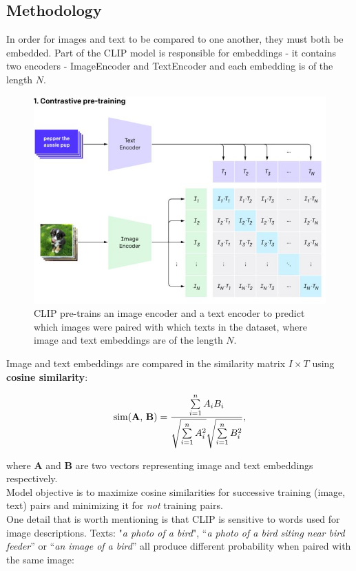 \documentclass[12pt,a4paper,openany]{book}
\begin{document}
\subsection{Methodology}
\noindent In order for images and text to be compared to one another, they must both be embedded.  Part of the CLIP model is responsible for embeddings -  it contains two encoders - ImageEncoder and TextEncoder and each embedding is of the length $N$.
 \begin{figure}[ht!]
     \centering
     \includegraphics[scale=0.4]{figs/clip_model_1.jpeg}
     \caption{CLIP pre-trains an image encoder and a text encoder to predict which images were paired with which texts in the dataset, where image and text embeddings are of the length $N$. \cite{clip_blog}}
 \end{figure}
 \newline
\noindent Image and text embeddings are compared in the similarity matrix $I \times T$ using \textbf{cosine similarity}:

\begin{equation}
\text{sim(\textbf{A}, \textbf{B})} = \frac{ \sum\limits_{i=1}^{n}{A_i  B_i} }{ \sqrt{\sum\limits_{i=1}^{n}{A_i^2}}  \sqrt{\sum\limits_{i=1}^{n}{B_i^2}} },
\end{equation}

\noindent where \textbf{A} and \textbf{B} are two vectors representing image and text embeddings respectively. \\
\noindent Model objective is to maximize cosine similarities for successive training (image, text) pairs and minimizing it for \textit{not} training pairs. \\
One detail that is worth mentioning is that CLIP is sensitive to words used for image descriptions. Texts: "\textit{a photo of a bird}", “\textit{a photo of a bird siting near bird feeder}” or “\textit{an image of a bird}” all produce different probability when paired with the same image:
\end{document}
